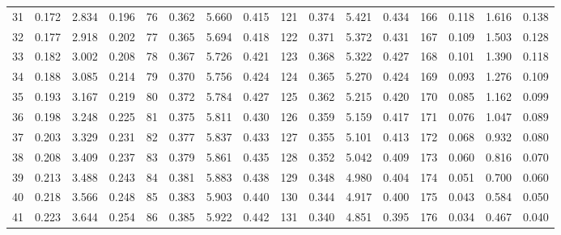 \begin{table}[!h]
{\begin{tabular}{rrrr|rrrr|rrrr|rrrr}
 31 & \tiny{  0.172} &   2.834 & \tiny{  0.196} &  76 & \tiny{  0.362} &   5.660 & \tiny{  0.415} & 121 & \tiny{  0.374} &   5.421 & \tiny{  0.434} & 166 & \tiny{  0.118} &   1.616 & \tiny{  0.138}\\
 32 & \tiny{  0.177} &   2.918 & \tiny{  0.202} &  77 & \tiny{  0.365} &   5.694 & \tiny{  0.418} & 122 & \tiny{  0.371} &   5.372 & \tiny{  0.431} & 167 & \tiny{  0.109} &   1.503 & \tiny{  0.128}\\
 33 & \tiny{  0.182} &   3.002 & \tiny{  0.208} &  78 & \tiny{  0.367} &   5.726 & \tiny{  0.421} & 123 & \tiny{  0.368} &   5.322 & \tiny{  0.427} & 168 & \tiny{  0.101} &   1.390 & \tiny{  0.118}\\
 34 & \tiny{  0.188} &   3.085 & \tiny{  0.214} &  79 & \tiny{  0.370} &   5.756 & \tiny{  0.424} & 124 & \tiny{  0.365} &   5.270 & \tiny{  0.424} & 169 & \tiny{  0.093} &   1.276 & \tiny{  0.109}\\
 35 & \tiny{  0.193} &   3.167 & \tiny{  0.219} &  80 & \tiny{  0.372} &   5.784 & \tiny{  0.427} & 125 & \tiny{  0.362} &   5.215 & \tiny{  0.420} & 170 & \tiny{  0.085} &   1.162 & \tiny{  0.099}\\
 36 & \tiny{  0.198} &   3.248 & \tiny{  0.225} &  81 & \tiny{  0.375} &   5.811 & \tiny{  0.430} & 126 & \tiny{  0.359} &   5.159 & \tiny{  0.417} & 171 & \tiny{  0.076} &   1.047 & \tiny{  0.089}\\
 37 & \tiny{  0.203} &   3.329 & \tiny{  0.231} &  82 & \tiny{  0.377} &   5.837 & \tiny{  0.433} & 127 & \tiny{  0.355} &   5.101 & \tiny{  0.413} & 172 & \tiny{  0.068} &   0.932 & \tiny{  0.080}\\
 38 & \tiny{  0.208} &   3.409 & \tiny{  0.237} &  83 & \tiny{  0.379} &   5.861 & \tiny{  0.435} & 128 & \tiny{  0.352} &   5.042 & \tiny{  0.409} & 173 & \tiny{  0.060} &   0.816 & \tiny{  0.070}\\
 39 & \tiny{  0.213} &   3.488 & \tiny{  0.243} &  84 & \tiny{  0.381} &   5.883 & \tiny{  0.438} & 129 & \tiny{  0.348} &   4.980 & \tiny{  0.404} & 174 & \tiny{  0.051} &   0.700 & \tiny{  0.060}\\
 40 & \tiny{  0.218} &   3.566 & \tiny{  0.248} &  85 & \tiny{  0.383} &   5.903 & \tiny{  0.440} & 130 & \tiny{  0.344} &   4.917 & \tiny{  0.400} & 175 & \tiny{  0.043} &   0.584 & \tiny{  0.050}\\
 41 & \tiny{  0.223} &   3.644 & \tiny{  0.254} &  86 & \tiny{  0.385} &   5.922 & \tiny{  0.442} & 131 & \tiny{  0.340} &   4.851 & \tiny{  0.395} & 176 & \tiny{  0.034} &   0.467 & \tiny{  0.040}\\

\end{tabular}}
\end{table}
